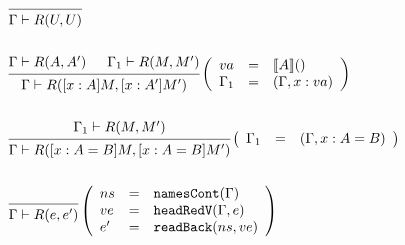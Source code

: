 \documentclass{article}
\theoremstyle{remark}
\begin{document}
\begin{align}
  &\begin{prooftree}
    \infer0{\Gamma \vdash R(U, U)} 
  \end{prooftree} \\
  \nonumber \\
  &\begin{prooftree}
    \hypo{\Gamma \vdash R(A, A')}
    \hypo{\Gamma_1 \vdash R(M, M')}
    \infer2{\Gamma \vdash R([x : A] M, [x : A'] M')} 
  \end{prooftree}\left(\begin{array}{l l l}
                         va &= & \llbracket A \rrbracket () \\
                         \Gamma_1 &= & (\Gamma, x : va)
                       \end{array}\right) \\
  \nonumber \\
  &\begin{prooftree}
    \hypo{\Gamma_1 \vdash R(M, M')}
    \infer1{\Gamma \vdash R([x : A = B] M, [x : A = B] M')} 
  \end{prooftree}\left(\begin{array}{l l l}
                         \Gamma_1 &= & (\Gamma, x : A = B)
                       \end{array}\right) \\
  \nonumber \\
  &\begin{prooftree}
    \infer0{\Gamma \vdash R(e, e')}
  \end{prooftree}\left(\begin{array}{l l l}
                         ns &= & \texttt{namesCont}(\Gamma) \\
                         ve &= & \texttt{headRedV}(\Gamma, e) \\
                         e' &= & \texttt{readBack}(ns, ve)
                       \end{array}\right)
\end{align}
\end{document}
